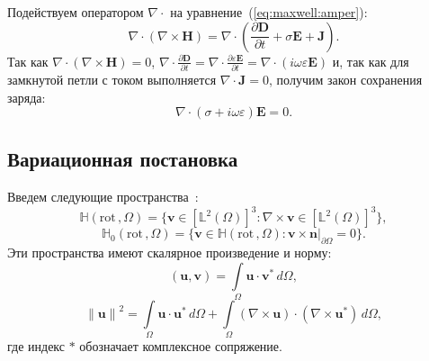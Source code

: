 \documentclass[a4paper,14pt]{article}
\begin{document}
Подействуем оператором $\nabla \cdot$ на уравнение~(\ref{eq:maxwell:amper}):
\begin{equation*}
	\nabla \cdot ( \nabla \times \mathbf{H} ) = \nabla \cdot ( \frac{\partial \mathbf{D}}{\partial t} + \sigma \mathbf{E} + \mathbf{J} ) .
\end{equation*}
Так как $\nabla \cdot ( \nabla \times \mathbf{H} ) = 0$, $\nabla \cdot \frac{\partial \mathbf{D}}{\partial t} = \nabla \cdot \frac{\partial \varepsilon \mathbf{E}}{\partial t} = \nabla \cdot (i \omega \varepsilon \mathbf{E})$ и, так как для замкнутой петли с током выполняется $\nabla \cdot \mathbf{J} = 0$, получим закон сохранения заряда:
\begin{equation}
	\nabla \cdot ( \sigma + i \omega \varepsilon ) \mathbf{E} = 0 . \label{eq:charge}
\end{equation}


\subsection{Вариационная постановка}
Введем следующие пространства~\citep{balandin,monk}:
\begin{equation*}
	\mathbb{H} ( \mathrm{rot}\,, \Omega ) = \lbrace \mathbf{v} \in [\mathbb{L}^{2}(\Omega)]^{3} : \nabla \times \mathbf{v} \in [\mathbb{L}^{2}(\Omega)]^{3} \rbrace , \label{eq:H_rot}
\end{equation*}
\begin{equation*}
	\mathbb{H}_{0}( \mathrm{rot}\,, \Omega ) = \lbrace \mathbf{v} \in \mathbb{H}(\mathrm{rot}\,, \Omega) : \left. \mathbf{v} \times \mathbf{n} \right|_{\partial \Omega} = 0  \rbrace . \label{eq:H0_rot}
\end{equation*}
Эти пространства имеют скалярное произведение и норму:
\begin{equation*}
	( \mathbf{u}, \mathbf{v} ) = \int\limits_{\Omega} \mathbf{u} \cdot \mathbf{v}^{*} \,d\Omega ,
\end{equation*}
\begin{equation*}
	\left \| \mathbf{u} \right \| ^{2} = \int\limits_{\Omega} \mathbf{u} \cdot \mathbf{u}^{*} \,d\Omega + \int\limits_{\Omega} ( \nabla \times \mathbf{u} ) \cdot ( \nabla \times \mathbf{u}^{*} ) \,d\Omega ,
\end{equation*}
где индекс $*$ обозначает комплексное сопряжение.
\end{document}
